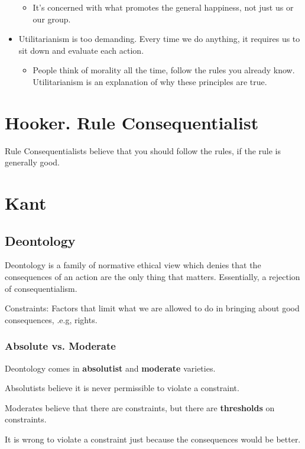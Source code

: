 \documentclass[12pt]{article}
\begin{document}
\begin{itemize}
          \begin{itemize}
              \item It's concerned with what promotes the general happiness, not just us or our group.
          \end{itemize}
    \item Utilitarianism is too demanding. Every time we do anything, it requires us to sit down and evaluate each action.
          \begin{itemize}
              \item People think of morality all the time, follow the rules you already know. Utilitarianism is an explanation of why these principles are true.
          \end{itemize}
\end{itemize}

\section{Hooker. Rule Consequentialist}
Rule Consequentialists believe that you should follow the rules, if the rule is generally good.


\section{Kant}

\subsection{Deontology}
Deontology is a family of normative ethical view which denies that the consequences of an action are the only thing that matters. Essentially, a rejection of consequentialism.

Constraints: Factors that limit what we are allowed to do in bringing about good consequences, .e.g, rights.

\subsubsection{Absolute vs. Moderate}
Deontology comes in \textbf{absolutist} and \textbf{moderate} varieties.

Absolutists believe it is never permissible to violate a constraint.

Moderates believe that there are constraints, but there are \textbf{thresholds} on constraints.

It is wrong to violate a constraint just because the consequences would be better.
\end{document}
